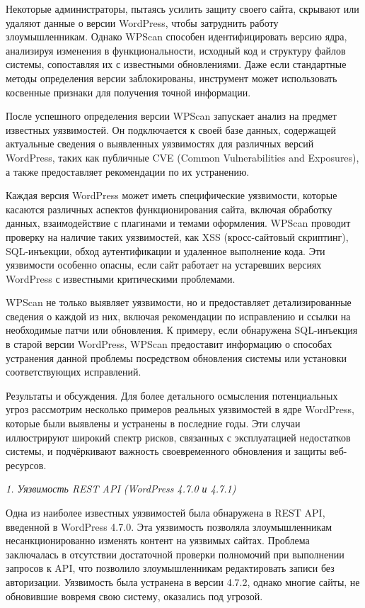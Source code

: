 Некоторые администраторы, пытаясь усилить защиту своего сайта, скрывают
или удаляют данные о версии WordPress, чтобы затруднить работу
злоумышленникам. Однако WPScan способен идентифицировать версию ядра,
анализируя изменения в функциональности, исходный код и структуру файлов
системы, сопоставляя их с известными обновлениями. Даже если стандартные
методы определения версии заблокированы, инструмент может использовать
косвенные признаки для получения точной информации.

После успешного определения версии WPScan запускает анализ на предмет
известных уязвимостей. Он подключается к своей базе данных, содержащей
актуальные сведения о выявленных уязвимостях для различных версий
WordPress, таких как публичные CVE (Common Vulnerabilities and
Exposures), а также предоставляет рекомендации по их устранению.

Каждая версия WordPress может иметь специфические уязвимости, которые
касаются различных аспектов функционирования сайта, включая обработку
данных, взаимодействие с плагинами и темами оформления. WPScan проводит
проверку на наличие таких уязвимостей, как XSS (кросс-сайтовый
скриптинг), SQL-инъекции, обход аутентификации и удаленное выполнение
кода. Эти уязвимости особенно опасны, если сайт работает на устаревших
версиях WordPress с известными критическими проблемами.

WPScan не только выявляет уязвимости, но и предоставляет
детализированные сведения о каждой из них, включая рекомендации по
исправлению и ссылки на необходимые патчи или обновления. К примеру,
если обнаружена SQL-инъекция в старой версии WordPress, WPScan
предоставит информацию о способах устранения данной проблемы посредством
обновления системы или установки соответствующих исправлений.

Результаты и обсуждения. Для более детального осмысления потенциальных
угроз рассмотрим несколько примеров реальных уязвимостей в ядре
WordPress, которые были выявлены и устранены в последние годы. Эти
случаи иллюстрируют широкий спектр рисков, связанных с эксплуатацией
недостатков системы, и подчёркивают важность своевременного обновления и
защиты веб-ресурсов.

\emph{1. Уязвимость REST API (WordPress 4.7.0 и 4.7.1)}

Одна из наиболее известных уязвимостей была обнаружена в REST API,
введенной в WordPress 4.7.0. Эта уязвимость позволяла злоумышленникам
несанкционированно изменять контент на уязвимых сайтах. Проблема
заключалась в отсутствии достаточной проверки полномочий при выполнении
запросов к API, что позволило злоумышленникам редактировать записи без
авторизации. Уязвимость была устранена в версии 4.7.2, однако многие
сайты, не обновившие вовремя свою систему, оказались под угрозой.

